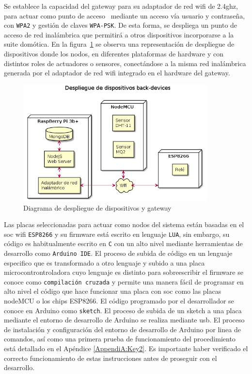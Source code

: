 \vspace{0.5cm}

Se establece la capacidad del \gls{gateway} para su adaptador de red \gls{wifi} de 2.4ghz, para actuar como punto de acceso~\cite{raspberrypiasaccesspoint} mediante un acceso vía usuario y contraseña, con \verb|WPA2| y gestión de claves \verb|WPA-PSK|. De esta forma, se despliega un punto de acceso de red inalámbrica que permitirá a otros dispositivos incorporarse a la suite domótica. En la figura~\ref{deploydevicesGateway} se observa una representación de despliegue de dispositivos donde los nodos, en diferentes plataformas de hardware y con distintos roles de actuadores o sensores, conectándose a la misma red inalámbrica generada por el adaptador de red \gls{wifi} integrado en el hardware del \gls{gateway}.

\begin{figure}[hbt!]
\label{deploydevicesGateway}
\centering
\includegraphics[height=2.5in]{figures/diagrams/physical-devices/back-devices.png}
\caption[Diagrama de despliegue de back-end]{Diagrama de despliegue de dispositivos y gateway\footnotemark}
\end{figure}

\vspace{0.5cm}

Las placas seleccionadas para actuar como nodos del sistema están basadas en el \gls{soc} \gls{wifi} \verb|ESP8266| y su firmware está escrito en lenguaje \verb|LUA|, sin embargo, su código es habitualmente escrito en \verb|C| con un alto nivel mediante herramientas de desarrollo como \verb|Arduino IDE|. El proceso de subida de código en un lenguaje especifico que es transformado a otro lenguaje y subido a una placa microcontrontroladora cuyo lenguaje es distinto para sobreescribir el firmware se conoce como \verb|compilación cruzada| y permite una manera fácil de programar en alto nivel el código que hace funcionar una placa con \gls{soc} como las placas nodeMCU o los chips ESP8266. El código programado por el desarrollador se conoce en Arduino como \verb|sketch|. El proceso de subida de un \gls{sketch} a una placa mediante el entorno de desarrollo de Arduino se realiza mediante \gls{usb}. El proceso de instalación y configuración del entorno de desarrollo de Arduino por linea de comandos, así como una primera prueba de funcionamiento del procedimiento está detallado en el Apéndice \ref{AppendiA:Key2}. Es importante haber verificado el correcto funcionamiento de estas instrucciones antes de proseguir con el desarrollo.

